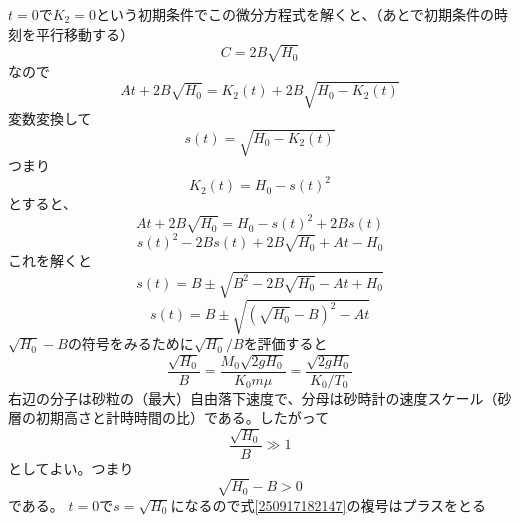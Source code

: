\documentclass[]{article}
\begin{document}
$t=0$で$K_2=0$という初期条件でこの微分方程式を解くと、（あとで初期条件の時刻を平行移動する）
\begin{equation} \label{250917180719} 
  C = 2B\sqrt{H_0}
\end{equation}
なので
\begin{equation} \label{250917181329} 
   A t + 2B\sqrt{H_0} = K_2(t) + 2B\sqrt{H_0-K_2(t)}
\end{equation}
変数変換して
\begin{equation} \label{250917181440} 
   s(t) =  \sqrt{H_0 - K_2(t)}
\end{equation}
つまり
\begin{equation} \label{250917181759} 
   K_2(t) = H_0 - s(t)^2
\end{equation}
とすると、
\begin{equation} \label{250917181553} 
   A t + 2B\sqrt{H_0}  = H_0 - s(t)^2 + 2Bs(t)
\end{equation}
\begin{equation} \label{250917181633} 
   s(t)^2 - 2Bs(t) + 2B\sqrt{H_0} + At - H_0
\end{equation}
これを解くと
\begin{equation} \label{250917181902} 
   s(t) = B \pm \sqrt{B^2-2B\sqrt{H_0} -At + H_0}
\end{equation}
\begin{equation} \label{250917182147} 
   s(t) = B\pm \sqrt{(\sqrt{H_0}-B)^2-At}
\end{equation}
$\sqrt{H_0}-B$の符号をみるために$\sqrt{H_0}/B$を評価すると
\begin{equation} \label{250917182519} 
   \frac{\sqrt{H_0}}{B} = \frac{M_0\sqrt{2gH_0}}{K_0m\mu} = \frac{\sqrt{2gH_0}}{K_0/T_0}
\end{equation}
右辺の分子は砂粒の（最大）自由落下速度で、分母は砂時計の速度スケール（砂層の初期高さと計時時間の比）である。したがって
\begin{equation} \label{250917183422} 
    \frac{\sqrt{H_0}}{B} \gg 1
\end{equation}
としてよい。つまり
\begin{equation} \label{250917183450} 
   \sqrt{H_0}-B >0
\end{equation}
である。
$t=0$で$s=\sqrt{H_0}$になるので式\eqref{250917182147}の複号はプラスをとる
\end{document}

